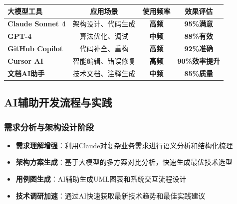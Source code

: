 \documentclass[12pt,a4paper]{article}
\begin{document}
\begin{table}[H]
\centering
\begin{tcolorbox}[
    colback=light,
    colframe=primary,
    title={\textbf{大模型辅助开发技术栈}},
    coltitle=white,
    colbacktitle=primary,
    fonttitle=\bfseries,
    rounded corners=5pt,
    width=0.95\textwidth
]
\begin{tabular}{lccc}
\toprule
\rowcolor{secondary!20}
\textbf{大模型工具} & \textbf{应用场景} & \textbf{使用频率} & \textbf{效果评估} \\
\midrule
\textbf{Claude Sonnet 4} & 架构设计、代码生成 & \textcolor{success}{\textbf{高频}} & \textcolor{success}{\textbf{95\%满意}} \\
\rowcolor{light}
\textbf{GPT-4} & 算法优化、调试 & \textcolor{warning}{\textbf{中频}} & \textcolor{success}{\textbf{88\%有效}} \\
\textbf{GitHub Copilot} & 代码补全、重构 & \textcolor{success}{\textbf{高频}} & \textcolor{success}{\textbf{92\%准确}} \\
\rowcolor{light}
\textbf{Cursor AI} & 智能编辑、错误修复 & \textcolor{success}{\textbf{高频}} & \textcolor{success}{\textbf{90\%效率提升}} \\
\textbf{文档AI助手} & 技术文档、注释生成 & \textcolor{warning}{\textbf{中频}} & \textcolor{success}{\textbf{85\%质量}} \\
\bottomrule
\end{tabular}
\end{tcolorbox}
\end{table}

\subsection{AI辅助开发流程与实践}

\subsubsection{需求分析与架构设计阶段}

\begin{successbox}[title={智能需求分析实践}]
\begin{itemize}[nosep]
    \item \textbf{需求理解增强}：利用Claude对复杂业务需求进行语义分析和结构化梳理
    \item \textbf{架构方案生成}：基于大模型的多方案对比分析，快速生成最优技术选型
    \item \textbf{用例图生成}：AI辅助生成UML图表和系统交互流程设计
    \item \textbf{技术调研加速}：通过AI快速获取最新技术趋势和最佳实践建议
\end{itemize}
\end{successbox}
\end{document}
